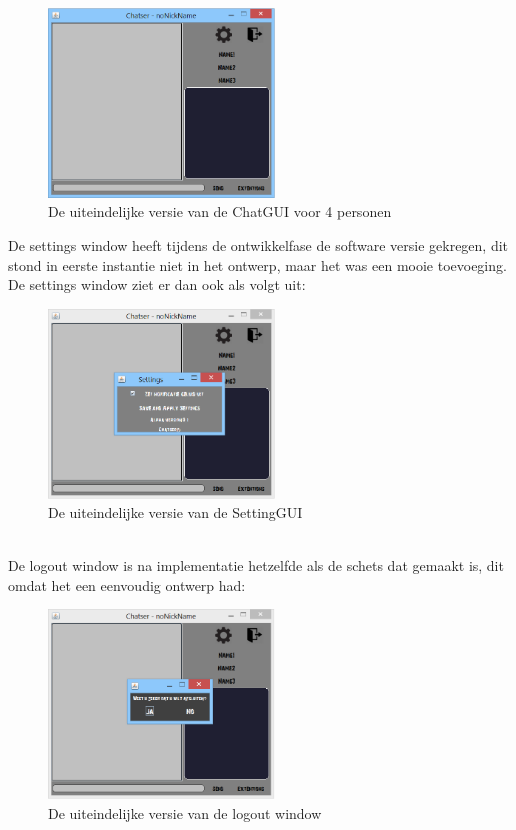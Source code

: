 \documentclass[12pt]{article}
\begin{document}
\begin{figure}[ht]
\begin{center}
\includegraphics[width = 60mm]{chatser}
\caption{De uiteindelijke versie van de ChatGUI voor 4 personen}
\label{figure008}
\end{center}
\end{figure}
\noindent De settings window heeft tijdens de ontwikkelfase de software versie gekregen, dit stond in eerste instantie niet in het ontwerp, maar het was een mooie toevoeging. De settings window ziet er dan ook als volgt uit:
\begin{figure}[ht]
\begin{center}
\includegraphics[width = 60mm]{chatsersettingsaan}
\caption{De uiteindelijke versie van de SettingGUI}
\label{figure009}
\end{center}
\end{figure}
\\

\noindent De logout window is na implementatie hetzelfde als de schets dat gemaakt is, dit omdat het een eenvoudig ontwerp had:
\begin{figure}[ht]
\begin{center}
\includegraphics[width = 60mm]{chatserafsluiten}
\caption{De uiteindelijke versie van de logout window}
\label{figure010}
\end{center}
\end{figure}
\\
\end{document}
